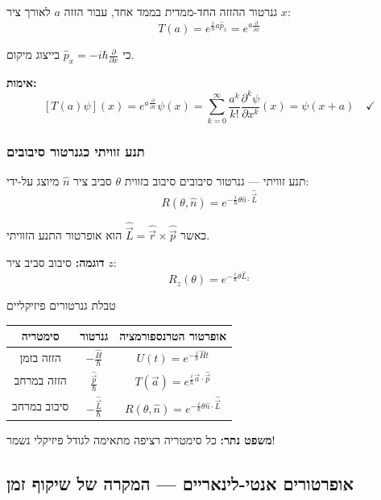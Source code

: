 \begin{examplebox}{גנרטור ההזזה החד-ממדית}
בממד אחד, עבור הזזה $a$ לאורך ציר $x$:
\[
T(a) = e^{\frac{i}{\hbar}a\hat{p}_x} = e^{a\frac{\partial}{\partial x}}
\]

כי $\hat{p}_x = -i\hbar\frac{\partial}{\partial x}$ בייצוג מיקום.

\textbf{אימות:}
\[
[T(a)\psi](x) = e^{a\frac{\partial}{\partial x}}\psi(x) = \sum_{k=0}^{\infty}\frac{a^k}{k!}\frac{\partial^k\psi}{\partial x^k}(x) = \psi(x + a) \quad \checkmark
\]
\end{examplebox}

\subsubsection{תנע זוויתי כגנרטור סיבובים}

\begin{importantbox}{תנע זוויתי — גנרטור סיבובים}
סיבוב בזווית $\theta$ סביב ציר $\hat{n}$ מיוצג על-ידי:
\[
\boxed{R(\theta, \hat{n}) = e^{-\frac{i}{\hbar}\theta \hat{n} \cdot \hat{\vec{L}}}}
\]

כאשר $\hat{\vec{L}} = \hat{\vec{r}} \times \hat{\vec{p}}$ הוא אופרטור התנע הזוויתי.

\textbf{דוגמה:} סיבוב סביב ציר $z$:
\[
R_z(\theta) = e^{-\frac{i}{\hbar}\theta \hat{L}_z}
\]
\end{importantbox}

\begin{summarybox}{טבלת גנרטורים פיזיקליים}
\begin{center}
\begin{tabular}{|c|c|c|}
\hline
\textbf{סימטריה} & \textbf{גנרטור} & \textbf{אופרטור הטרנספורמציה} \\ \hline
הזזה בזמן & $-\frac{\hat{H}}{\hbar}$ & $U(t) = e^{-\frac{i}{\hbar}\hat{H}t}$ \\ \hline
הזזה במרחב & $\frac{\hat{\vec{p}}}{\hbar}$ & $T(\vec{a}) = e^{\frac{i}{\hbar}\vec{a} \cdot \hat{\vec{p}}}$ \\ \hline
סיבוב במרחב & $-\frac{\hat{\vec{L}}}{\hbar}$ & $R(\theta, \hat{n}) = e^{-\frac{i}{\hbar}\theta \hat{n} \cdot \hat{\vec{L}}}$ \\ \hline
\end{tabular}
\end{center}

\textbf{משפט נתר:} כל סימטריה רציפה מתאימה לגודל פיזיקלי נשמר!
\end{summarybox}

\subsection{אופרטורים אנטי-לינאריים — המקרה של שיקוף זמן}


